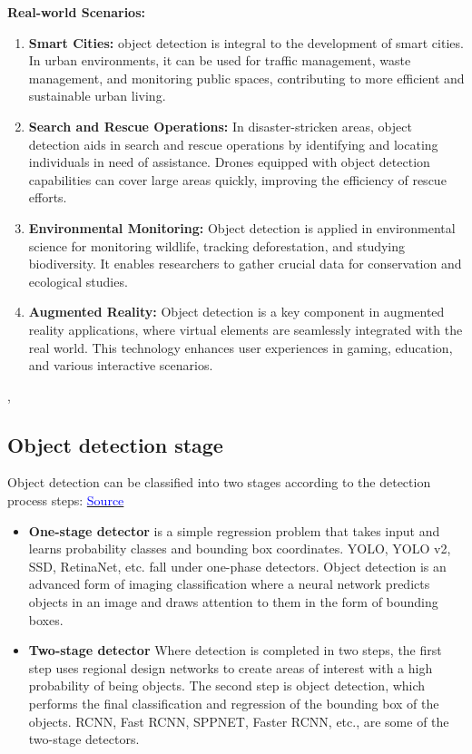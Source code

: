 \textbf{Real-world Scenarios:}\\
\begin{enumerate}
    \item \textbf{Smart Cities:} object detection is integral to the development of smart cities. In urban environments, it can be used for traffic management, waste management, and monitoring public spaces, contributing to more efficient and sustainable urban living.
    \item \textbf{Search and Rescue Operations:} In disaster-stricken areas, object detection aids in search and rescue operations by identifying and locating individuals in need of assistance. Drones equipped with object detection capabilities can cover large areas quickly, improving the efficiency of rescue efforts.
    \item \textbf{Environmental Monitoring: } Object detection is applied in environmental science for monitoring wildlife, tracking deforestation, and studying biodiversity. It enables researchers to gather crucial data for conservation and ecological studies.
    \item \textbf{Augmented Reality:} Object detection is a key component in augmented reality applications, where virtual elements are seamlessly integrated with the real world. This technology enhances user experiences in gaming, education, and various interactive scenarios.
\end{enumerate} \cite{ansari2020building}, \cite{pathak2018application}

\subsection{Object detection stage}
Object detection can be classified into two stages according to the detection process steps:
\href{https://www.ijert.org/object-detection-using-yolo-and-mobilenet-ssd-a-comparative-study}{\textcolor{blue}{Source}}
\begin{itemize}
    \item \textbf{One-stage detector}  is a simple regression problem that takes input and learns probability classes and bounding box coordinates. YOLO, YOLO v2, SSD, RetinaNet, etc. fall under one-phase detectors. Object detection is an advanced form of imaging classification where a neural network predicts objects in an image and draws attention to them in the form of bounding boxes. \cite{oneStage}
    \item \textbf{Two-stage detector} Where detection is completed in two steps, the first step uses regional design networks to create areas of interest with a high probability of being objects. The second step is object detection, which performs the final classification and regression of the bounding box of the objects. RCNN, Fast RCNN, SPPNET, Faster RCNN, etc., are some of the two-stage detectors. \cite{du2020overview}
\end{itemize}

